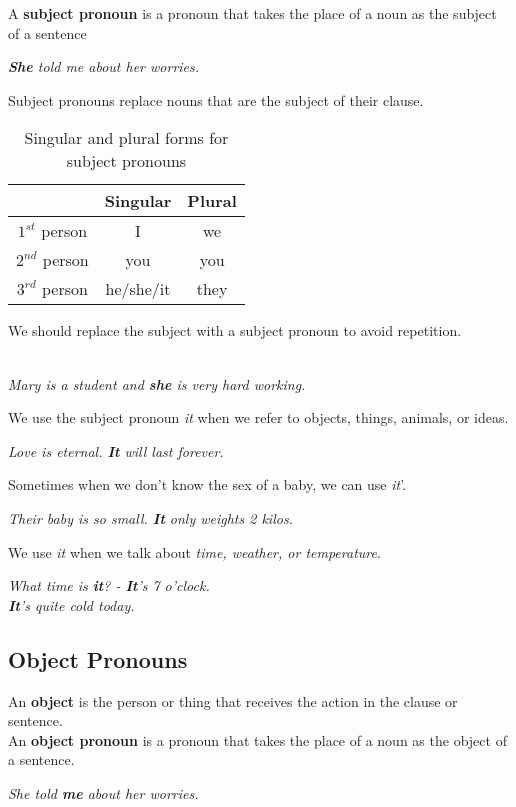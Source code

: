 \documentclass[10pt,a4paper]{article}
\begin{document}
A \textbf{subject pronoun} is a pronoun that takes the place of a noun as the subject of a sentence

\begin{center}
\textit{
\textbf{She} told me about her worries.}
\end{center}
Subject pronouns replace nouns that are the subject of their clause.
\begin{table}[h]
\begin{center}
		\begin{tabular}{|c|c|c|}
		\hline
		& \textbf{Singular} & \textbf{Plural} \\
		\hline
		$1^{st}$ person & I & we \\ \hline
		$2^{nd}$ person & you & you \\ \hline
		$3^{rd}$ person & he/she/it & they \\ \hline
	\end{tabular}
\end{center}
\caption{\label{tab:nouns4}Singular and plural forms for subject pronouns}
\end{table}

We should replace the subject with a subject pronoun to avoid repetition.
\begin{center}
\textit{
\\
Mary is a student and \textbf{she} is very hard working.}
\end{center}

We use the subject pronoun \textit{it} when we refer to objects, things, animals, or ideas.
\begin{center}
		\textit{ Love is eternal. \textbf{It} will last forever.}
\end{center}

Sometimes when we don't know the sex of a baby, we can use \textit{it}'.
\begin{center}
\textit{
Their baby is so small. \textbf{It} only weights 2 kilos.}
\end{center}
\hspace{0.4cm} We use \textit{it} when we talk about \textit{time, weather, or temperature}.
\begin{center}
\textit{
	What time is \textbf{it}? - \textbf{It}'s 7 o'clock.\\
	\textbf{It}'s quite cold today.}
\end{center}

\subsection{Object Pronouns}
An \textbf{object} is the person or thing that receives the action in the clause or sentence.\\
An \textbf{object pronoun} is a pronoun that takes the place of a noun as the object of a sentence.
\begin{center}
\textit{
She told \textbf{me} about her worries.}
\end{center}
\end{document}
